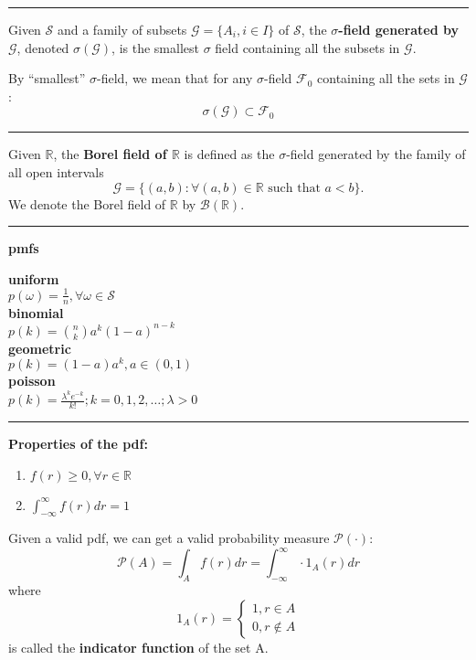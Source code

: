 \documentclass{article}
\renewcommand{\S}{\mathcal{S}}
\renewcommand{\P}{\mathcal{P}}
\providecommand{\B}{\mathcal{B}}
\providecommand{\G}{\mathcal{G}}
\providecommand{\F}{\mathcal{F}}
\providecommand{\R}{\mathbb{R}}
\begin{document}
\begin{multicols*}{3}
        \noindent\rule{\columnwidth}{0.4pt}

        Given $\S$ and a family of subsets $\G=\{A_i, i\in I\}$ of $\S$, the \textbf{$\sigma$-field generated by $\G$}, denoted $\sigma(\G)$, is the smallest $\sigma$ field containing all the subsets in $\G$.

        By ``smallest'' $\sigma$-field, we mean that for any $\sigma$-field $\F_0$ containing all the sets in $\G$:
        \begin{equation*}
            \sigma(\G)\subset\F_0
        \end{equation*}

        \noindent\rule{\columnwidth}{0.4pt}

        Given $\R$, the \textbf{Borel field of $\R$} is defined as the $\sigma$-field generated by the family of all open intervals
        \begin{equation*}
            \G=\{(a,b):\forall(a,b)\in\R \text{ such that }a < b\}.
        \end{equation*}
        We denote the Borel field of $\R$ by $\B(\R)$.

        \noindent\rule{\columnwidth}{0.4pt}

        \textbf{pmfs}

        \textbf{uniform}\\
        $p(\omega)=\frac{1}{n},\forall\omega\in\S$\\

        \textbf{binomial}\\
        $p(k)=\allowbreak{n\choose k}a^k(1-a)^{n-k}$\\

        \textbf{geometric}\\
        $p(k)=(1-a)a^k,a\in(0,1)$\\

        \textbf{poisson}\\
        $p(k)=\frac{\lambda^{k}e^{-k}}{k!};k=0,1,2,\dots;\lambda>0$

        \noindent\rule{\columnwidth}{0.4pt}

        \textbf{Properties of the pdf:}
        \begin{enumerate}
            \item $f(r)\geq0,\forall r\in\R$
            \item $\int_{-\infty}^{\infty} f(r)dr=1$
        \end{enumerate}
        Given a valid pdf, we can get a valid probability measure $\P(\cdot)$:
        \begin{equation*}
            \P(A)=\int_{A}f(r)dr=\int_{-\infty}^{\infty}\cdot1_A(r)dr
        \end{equation*}
        where
        \begin{equation*}
            1_A(r) =
            \begin{cases}
                1,r\in A\\
                0,r\notin A
            \end{cases}
        \end{equation*}
        is called the \textbf{indicator function} of the set A\@.


\end{multicols*}
\end{document}
